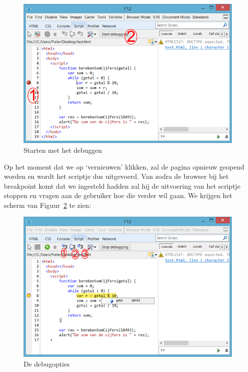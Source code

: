 \begin{figure}
\centering
\includegraphics[scale=0.8]{Debuggen/debug2.png}
\caption{Starten met het debuggen}\label{fig:debug2}
\end{figure}

Op het moment dat we op `vernieuwen' klikken, zal de pagina opnieuw geopend worden en wordt het scriptje dus uitgevoerd. Van zodra de browser bij het breakpoint komt dat we ingesteld hadden zal hij de uitvoering van het scriptje stoppen en vragen aan de gebruiker hoe die verder wil gaan. We krijgen het scherm van Figuur~\ref{fig:debug3} te zien:

\begin{figure}
\centering
\includegraphics[scale=0.8]{Debuggen/debug3.png}
\caption{De debugopties}\label{fig:debug3}
\end{figure}

